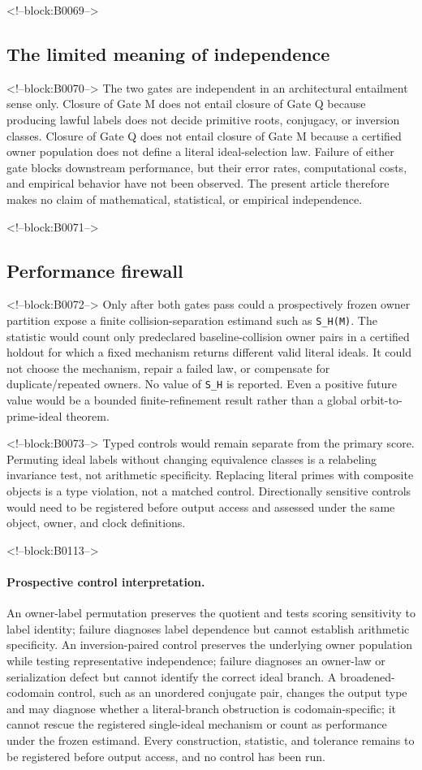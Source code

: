 \documentclass[11pt,a4paper]{article}
\begin{document}
<!--block:B0069-->
\subsection{The limited meaning of independence}

<!--block:B0070-->
The two gates are independent in an architectural entailment sense only. Closure of Gate M does not entail closure of Gate Q because producing lawful labels does not decide primitive roots, conjugacy, or inversion classes. Closure of Gate Q does not entail closure of Gate M because a certified owner population does not define a literal ideal-selection law. Failure of either gate blocks downstream performance, but their error rates, computational costs, and empirical behavior have not been observed. The present article therefore makes no claim of mathematical, statistical, or empirical independence.

<!--block:B0071-->
\subsection{Performance firewall}

<!--block:B0072-->
Only after both gates pass could a prospectively frozen owner partition expose a finite collision-separation estimand such as \texttt{S\_H(M)}. The statistic would count only predeclared baseline-collision owner pairs in a certified holdout for which a fixed mechanism returns different valid literal ideals. It could not choose the mechanism, repair a failed law, or compensate for duplicate/repeated owners. No value of \texttt{S\_H} is reported. Even a positive future value would be a bounded finite-refinement result rather than a global orbit-to-prime-ideal theorem.

<!--block:B0073-->
Typed controls would remain separate from the primary score. Permuting ideal labels without changing equivalence classes is a relabeling invariance test, not arithmetic specificity. Replacing literal primes with composite objects is a type violation, not a matched control. Directionally sensitive controls would need to be registered before output access and assessed under the same object, owner, and clock definitions.

<!--block:B0113-->
\paragraph{Prospective control interpretation.} An owner-label permutation preserves the quotient and tests scoring sensitivity to label identity; failure diagnoses label dependence but cannot establish arithmetic specificity. An inversion-paired control preserves the underlying owner population while testing representative independence; failure diagnoses an owner-law or serialization defect but cannot identify the correct ideal branch. A broadened-codomain control, such as an unordered conjugate pair, changes the output type and may diagnose whether a literal-branch obstruction is codomain-specific; it cannot rescue the registered single-ideal mechanism or count as performance under the frozen estimand. Every construction, statistic, and tolerance remains to be registered before output access, and no control has been run.
\end{document}
